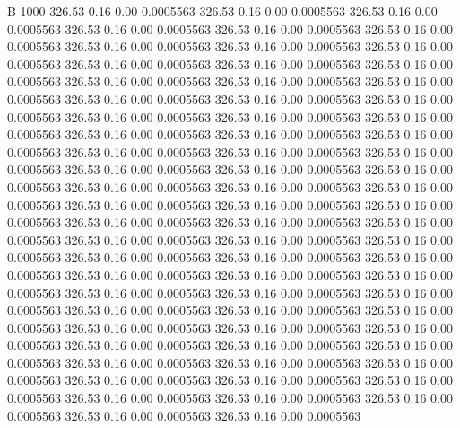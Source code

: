 


B 1000
 326.53    0.16    0.00   0.0005563
 326.53    0.16    0.00   0.0005563
 326.53    0.16    0.00   0.0005563
 326.53    0.16    0.00   0.0005563
 326.53    0.16    0.00   0.0005563
 326.53    0.16    0.00   0.0005563
 326.53    0.16    0.00   0.0005563
 326.53    0.16    0.00   0.0005563
 326.53    0.16    0.00   0.0005563
 326.53    0.16    0.00   0.0005563
 326.53    0.16    0.00   0.0005563
 326.53    0.16    0.00   0.0005563
 326.53    0.16    0.00   0.0005563
 326.53    0.16    0.00   0.0005563
 326.53    0.16    0.00   0.0005563
 326.53    0.16    0.00   0.0005563
 326.53    0.16    0.00   0.0005563
 326.53    0.16    0.00   0.0005563
 326.53    0.16    0.00   0.0005563
 326.53    0.16    0.00   0.0005563
 326.53    0.16    0.00   0.0005563
 326.53    0.16    0.00   0.0005563
 326.53    0.16    0.00   0.0005563
 326.53    0.16    0.00   0.0005563
 326.53    0.16    0.00   0.0005563
 326.53    0.16    0.00   0.0005563
 326.53    0.16    0.00   0.0005563
 326.53    0.16    0.00   0.0005563
 326.53    0.16    0.00   0.0005563
 326.53    0.16    0.00   0.0005563
 326.53    0.16    0.00   0.0005563
 326.53    0.16    0.00   0.0005563
 326.53    0.16    0.00   0.0005563
 326.53    0.16    0.00   0.0005563
 326.53    0.16    0.00   0.0005563
 326.53    0.16    0.00   0.0005563
 326.53    0.16    0.00   0.0005563
 326.53    0.16    0.00   0.0005563
 326.53    0.16    0.00   0.0005563
 326.53    0.16    0.00   0.0005563
 326.53    0.16    0.00   0.0005563
 326.53    0.16    0.00   0.0005563
 326.53    0.16    0.00   0.0005563
 326.53    0.16    0.00   0.0005563
 326.53    0.16    0.00   0.0005563
 326.53    0.16    0.00   0.0005563
 326.53    0.16    0.00   0.0005563
 326.53    0.16    0.00   0.0005563
 326.53    0.16    0.00   0.0005563
 326.53    0.16    0.00   0.0005563
 326.53    0.16    0.00   0.0005563
 326.53    0.16    0.00   0.0005563
 326.53    0.16    0.00   0.0005563
 326.53    0.16    0.00   0.0005563
 326.53    0.16    0.00   0.0005563
 326.53    0.16    0.00   0.0005563
 326.53    0.16    0.00   0.0005563
 326.53    0.16    0.00   0.0005563
 326.53    0.16    0.00   0.0005563
 326.53    0.16    0.00   0.0005563
 326.53    0.16    0.00   0.0005563
 326.53    0.16    0.00   0.0005563
 326.53    0.16    0.00   0.0005563
 326.53    0.16    0.00   0.0005563
 326.53    0.16    0.00   0.0005563
 326.53    0.16    0.00   0.0005563
 326.53    0.16    0.00   0.0005563
 326.53    0.16    0.00   0.0005563
 326.53    0.16    0.00   0.0005563
 326.53    0.16    0.00   0.0005563
 326.53    0.16    0.00   0.0005563
